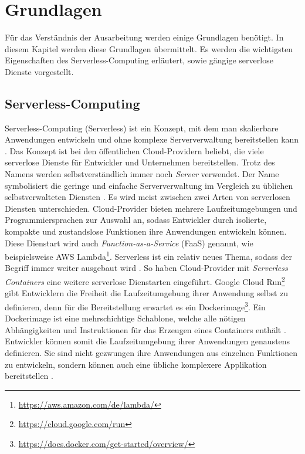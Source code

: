 \chapter{Grundlagen}
Für das Verständnis der Ausarbeitung werden einige Grundlagen benötigt.
In diesem Kapitel werden diese Grundlagen übermittelt.
Es werden die wichtigsten Eigenschaften des Serverless-Computing erläutert,
sowie gängige serverlose Dienste vorgestellt.

\section{Serverless-Computing}
Serverless-Computing (Serverless) ist ein Konzept, mit dem man skalierbare Anwendungen
entwickeln und ohne komplexe Serververwaltung bereitstellen kann \cite{CioGov}.
Das Konzept ist bei den öffentlichen Cloud-Providern beliebt, die viele
serverlose Dienste für Entwickler und Unternehmen bereitstellen. Trotz des Namens
werden selbstverständlich immer noch \emph{Server} verwendet. Der Name symbolisiert die geringe
und einfache Serververwaltung im Vergleich zu üblichen selbstverwalteten
Diensten \cite{CNCF}. Es wird meist zwischen zwei Arten von
serverlosen Diensten unterschieden. Cloud-Provider bieten mehrere
Laufzeitumgebungen und Programmiersprachen zur Auswahl an,
sodass Entwickler durch isolierte, kompakte und zustandslose Funktionen
ihre Anwendungen entwickeln können. Diese Dienstart wird auch
\emph{Function-as-a-Service} (FaaS) genannt, wie beispielsweise
AWS Lambda\footnote{\url{https://aws.amazon.com/de/lambda/}}.
Serverless ist ein relativ neues Thema, sodass
der Begriff immer weiter ausgebaut wird \cite{ServerlessTrends}.
So haben Cloud-Provider mit \emph{Serverless Containers}
eine weitere serverlose Dienstarten eingeführt.
Google Cloud Run\footnote{\url{https://cloud.google.com/run}}
gibt Entwicklern die Freiheit die Laufzeitumgebung ihrer Anwendung
selbst zu definieren, denn für die Bereitstellung erwartet es
ein Dockerimage\footnote{\url{https://docs.docker.com/get-started/overview/}}.
Ein Dockerimage ist eine mehrschichtige Schablone, welche
alle nötigen Abhängigkeiten und Instruktionen für das
Erzeugen eines Containers enthält
\cite{DockerDocs} \cite{RedHatDockerImage}.
Entwickler können somit die Laufzeitumgebung ihrer Anwendungen
genaustens definieren. Sie sind nicht gezwungen
ihre Anwendungen aus einzelnen Funktionen zu entwickeln,
sondern können auch eine übliche komplexere Applikation bereitstellen
\cite{ServerlessTrends}.

